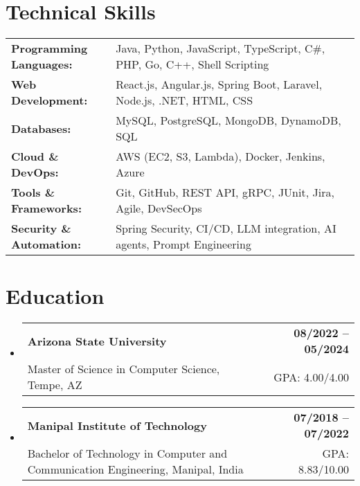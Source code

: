 \documentclass[letterpaper,11pt]{article}
\makeatletter
\newcommand{\educationSubheading}[4]{
  \vspace{-2pt}\item
    \begin{tabular*}{1.0\textwidth}[t]{l@{\extracolsep{\fill}}r}
      \textbf{\small #1} & \textbf{\small #2} \\
      {\small#3} & {\small #4} \\
    \end{tabular*}\vspace{-7pt}
}
\newcommand{\resumeSubHeadingListStart}{\begin{itemize}[leftmargin=0pt, label={}]}
\newcommand{\resumeSubHeadingListEnd}{\end{itemize}}
\makeatother
\begin{document}
\section{Technical Skills}
        \vspace{-14pt}
        \begin{table}[h]
            \footnotesize
            \begin{tabular}{p{0.3\linewidth} p{0.7\linewidth}}
                \textbf{Programming Languages:} & Java, Python, JavaScript, TypeScript, C\#, PHP, Go, C++, Shell Scripting \\
                \textbf{Web Development:} & React.js, Angular.js, Spring Boot, Laravel, Node.js, .NET, HTML, CSS \\
                \textbf{Databases:} & MySQL, PostgreSQL, MongoDB, DynamoDB, SQL \\
                \textbf{Cloud \& DevOps:} & AWS (EC2, S3, Lambda), Docker, Jenkins, Azure \\
                \textbf{Tools \& Frameworks:} & Git, GitHub, REST API, gRPC, JUnit, Jira, Agile, DevSecOps \\
                \textbf{Security \& Automation:} & Spring Security, CI/CD, LLM integration, AI agents, Prompt Engineering \\
            \end{tabular}
        \end{table}

 \vspace{-15pt}

\section{Education}
  \resumeSubHeadingListStart
    \educationSubheading
      {Arizona State University}{08/2022 -- 05/2024}
      {Master of Science in Computer Science, Tempe, AZ}{GPA: 4.00/4.00}

    \educationSubheading
      {Manipal Institute of Technology}{07/2018 -- 07/2022}
      {Bachelor of Technology in Computer and Communication Engineering, Manipal, India}{GPA: 8.83/10.00}
  \resumeSubHeadingListEnd
\end{document}
